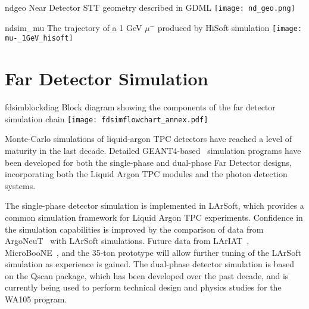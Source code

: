 \begin{cdrfigure}{ndgeo}
{Near Detector STT geometry described in GDML}
\texttt{[image: nd\_geo.png]}
\end{cdrfigure}

\begin{cdrfigure}{ndsim_mu}
{The trajectory of a 1 GeV $\mu^-$ produced by HiSoft simulation}
\texttt{[image: mu-\_1GeV\_hisoft]}
\end{cdrfigure}

\section{Far Detector Simulation}
\label{annex:detectors-sc-physics-software-simulation-fd}

\begin{cdrfigure}{fdsimblockdiag}
{Block diagram showing the components of the far detector simulation chain}
\texttt{[image: fdsimflowchart\_annex.pdf]}
\end{cdrfigure}

Monte-Carlo simulations of liquid-argon TPC detectors have reached a level of maturity
in the last decade.  Detailed GEANT4-based~\cite{GEANT4:NIM,GEANT4} simulation
programs have been developed  for both the single-phase and dual-phase Far Detector designs,
incorporating both the Liquid Argon TPC modules and the photon detection systems.   

The single-phase detector simulation is implemented in LArSoft,
which provides a common simulation framework for Liquid Argon TPC experiments.
Confidence in the simulation capabilities is improved by
the comparison of data from ArgoNeuT~\cite{Adamson:2013/02/28tla,argoneut-url,Acciarri:2013met,Anderson:2012mra} with LArSoft
simulations.  Future data from LArIAT~\cite{Adamson:2013/02/28tla,Cavanna:2014iqa},
MicroBooNE~\cite{Chen:2007ae,Jones:2011ci,microboonecdr}, and the 35-ton prototype will allow
further tuning of the LArSoft simulation as experience is gained.
The dual-phase detector simulation is based on the Qscan package,
which has been developed over the past decade, and is currently
being used to perform technical design and physics studies for
the WA105 program.

